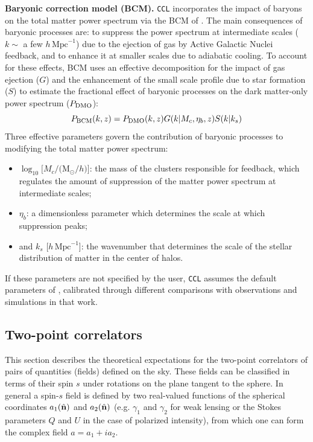 \documentclass[\docopts]{\docclass}
\newcommand{\nv}{\hat{\bf n}}
\newcommand{\ccl}{{\tt CCL}\xspace}
\begin{document}
 {\bf Baryonic correction model (BCM).} \ccl incorporates the impact of baryons on the total matter power spectrum via the BCM of \citet{Schneider15}. The main consequences of baryonic processes are: to suppress the power spectrum at intermediate scales ($k\sim$ a few $h\,\text{Mpc}^{-1}$) due to the ejection of gas by Active Galactic Nuclei feedback, and to enhance it at smaller scales due to adiabatic cooling. To account for these effects, BCM uses an effective decomposition for the impact of gas ejection ($G$) and the enhancement of the small scale profile due to star formation ($S$) to estimate the fractional effect of baryonic processes on the dark matter-only power spectrum ($P_{\rm DMO}$):
\begin{equation}
  P_{\rm BCM}(k,z)=P_{\rm DMO}(k,z) G(k|M_c,\eta_b,z)S(k|k_s)
\end{equation}
Three effective parameters govern the contribution of baryonic processes to modifying the total matter power spectrum:
 \begin{itemize}
   \item $\log_{10} [M_c/($M$_\odot/h)]$: the mass of the clusters responsible for feedback, which regulates the amount of suppression of the matter power spectrum at intermediate scales;
   \item $\eta_b$: a dimensionless parameter which determines the scale at which suppression peaks;
   \item and $k_s$ [$h\,\text{Mpc}^{-1}$]: the wavenumber that determines the scale of the stellar distribution of matter in the center of halos.
 \end{itemize}
 If these parameters are not specified by the user, \ccl assumes the default parameters of \citet{Schneider15}, calibrated through different comparisons with observations and simulations in that work.

\subsection{Two-point correlators}

This section describes the theoretical expectations for the two-point correlators of pairs of quantities (fields) defined on the sky. These fields can be classified in terms of their spin $s$ under rotations on the plane tangent to the sphere. In general a spin-$s$ field is defined by two real-valued functions of the spherical coordinates $a_1(\nv)$ and $a_2(\nv)$ (e.g. $\gamma_1$ and $\gamma_2$ for weak lensing or the Stokes parameters $Q$ and $U$ in the case of polarized intensity), from which one can form the complex field $a=a_1+ia_2$.
\end{document}
